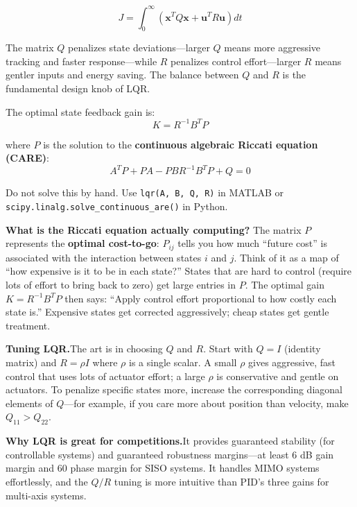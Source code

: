 \begin{equation}
J = \int_0^{\infty} \left( \mathbf{x}^T Q \mathbf{x} + \mathbf{u}^T R \mathbf{u} \right) dt
\end{equation}

The matrix $Q$ penalizes state deviations---larger $Q$ means more aggressive tracking and faster response---while $R$ penalizes control effort---larger $R$ means gentler inputs and energy saving. The balance between $Q$ and $R$ is the fundamental design knob of LQR.

The optimal state feedback gain is:
\begin{equation}
K = R^{-1} B^T P
\end{equation}

where $P$ is the solution to the \textbf{continuous algebraic Riccati equation (CARE)}:
\begin{equation}
A^T P + PA - PBR^{-1}B^T P + Q = 0
\end{equation}

Do not solve this by hand. Use \texttt{lqr(A, B, Q, R)} in MATLAB or \texttt{scipy.linalg.solve\_continuous\_are()} in Python.

\textbf{What is the Riccati equation actually computing?} The matrix $P$ represents the \textbf{optimal cost-to-go}: $P_{ij}$ tells you how much ``future cost'' is associated with the interaction between states $i$ and $j$. Think of it as a map of ``how expensive is it to be in each state?'' States that are hard to control (require lots of effort to bring back to zero) get large entries in $P$. The optimal gain $K = R^{-1}B^T P$ then says: ``Apply control effort proportional to how costly each state is.'' Expensive states get corrected aggressively; cheap states get gentle treatment.

\textbf{Tuning LQR.}\;The art is in choosing $Q$ and $R$. Start with $Q = I$ (identity matrix) and $R = \rho I$ where $\rho$ is a single scalar. A small $\rho$ gives aggressive, fast control that uses lots of actuator effort; a large $\rho$ is conservative and gentle on actuators. To penalize specific states more, increase the corresponding diagonal elements of $Q$---for example, if you care more about position than velocity, make $Q_{11} > Q_{22}$.

\textbf{Why LQR is great for competitions.}\;It provides guaranteed stability (for controllable systems) and guaranteed robustness margins---at least 6 dB gain margin and 60\textdegree{} phase margin for SISO systems. It handles MIMO systems effortlessly, and the $Q/R$ tuning is more intuitive than PID's three gains for multi-axis systems.


